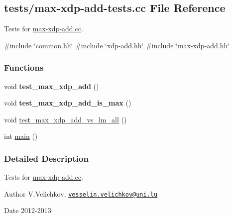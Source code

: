 \hypertarget{max-xdp-add-tests_8cc}{\subsection{tests/max-\/xdp-\/add-\/tests.cc \-File \-Reference}
\label{max-xdp-add-tests_8cc}
}


\-Tests for \hyperlink{max-xdp-add_8cc}{max-\/xdp-\/add.\-cc}.  


{\ttfamily \#include \char`\"{}common.\-hh\char`\"{}}\*
{\ttfamily \#include \char`\"{}xdp-\/add.\-hh\char`\"{}}\*
{\ttfamily \#include \char`\"{}max-\/xdp-\/add.\-hh\char`\"{}}\*
\subsubsection*{\-Functions}
\begin{DoxyCompactItemize}
\item 
\hypertarget{max-xdp-add-tests_8cc_a8165b07cef49192542665a5e296d3175}{void {\bfseries test\-\_\-max\-\_\-xdp\-\_\-add} ()}\label{max-xdp-add-tests_8cc_a8165b07cef49192542665a5e296d3175}

\item 
\hypertarget{max-xdp-add-tests_8cc_a518dcacdf678fedee7045a55a866d3d4}{void {\bfseries test\-\_\-max\-\_\-xdp\-\_\-add\-\_\-is\-\_\-max} ()}\label{max-xdp-add-tests_8cc_a518dcacdf678fedee7045a55a866d3d4}

\item 
void \hyperlink{max-xdp-add-tests_8cc_abd53feefc1baa3ebd75707af71b858c7}{test\-\_\-max\-\_\-xdp\-\_\-add\-\_\-vs\-\_\-lm\-\_\-all} ()
\item 
int \hyperlink{max-xdp-add-tests_8cc_ae66f6b31b5ad750f1fe042a706a4e3d4}{main} ()
\end{DoxyCompactItemize}


\subsubsection{\-Detailed \-Description}
\-Tests for \hyperlink{max-xdp-add_8cc}{max-\/xdp-\/add.\-cc}. \begin{DoxyAuthor}{\-Author}
\-V.\-Velichkov, \href{mailto:vesselin.velichkov@uni.lu}{\tt vesselin.\-velichkov@uni.\-lu} 
\end{DoxyAuthor}
\begin{DoxyDate}{\-Date}
2012-\/2013 
\end{DoxyDate}


